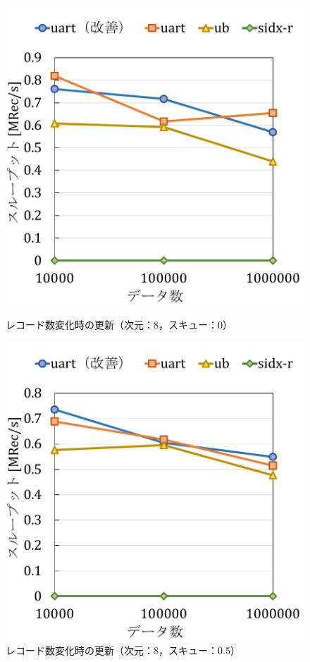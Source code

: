 \begin{figure}[tb]
  \begin{minipage}[c]{0.495\textwidth}
    \centering
    \includegraphics[scale=0.5]{./figures/graph-record-update-8-0.pdf}
    \caption{レコード数変化時の更新（次元：8，スキュー：0）}
    \label{graph:rec-upd-8-0}
  \end{minipage}
  \begin{minipage}[c]{0.495\textwidth}
    \centering
    \includegraphics[scale=0.5]{./figures/graph-record-update-8-0.5.pdf}
    \caption{レコード数変化時の更新（次元：8，スキュー：0.5）}
    \label{graph:rec-upd-8-0.5}
  \end{minipage}
\end{figure}

